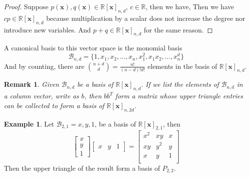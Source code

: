 \documentclass[12pt]{amsart}
\numberwithin{equation}{section}
\newtheorem{remark}[thm]{Remark}
\theoremstyle{definition}
\newtheorem{example}[thm]{Example}
\numberwithin{thm}{section}
\begin{document}
\begin{proof}
     Suppose $p(\mathbf{x}), q(\mathbf{x}) \in \mathbb{R}[\mathbf{x}]_{n, d}$, $c \in \mathbb{R}$, then we have,
     Then we have $cp \in \mathbb{R}[\mathbf{x}]_{n, d}$ because multiplication by a scalar does not increase the degree nor introduce new variables.
     And $p + q \in \mathbb{R}[\mathbf{x}]_{n, d}$ for the same reason. 

\end{proof}
A canonical basis to this vector space is the monomial basis 
\begin{equation*}
     \mathcal{B}_{n, d} = \{1, x_1, x_2, ..., x_n, x_1 ^ 2, x_1 x_2, ..., x_n^d\}
\end{equation*}
And by counting, there are ${n + d \choose d} = \frac{n!}{(n-d)! d!}$ elements in the basis of $\mathbb{R}[\mathbf{x}]_{n, d}$.

\begin{remark}
     \label{rem:idk}
     Given $\mathcal{B}_{n, d}$ be a basis of $\mathbb{R}[\mathbf{x}]_{n, d}$. 
     If we list the elements of $\mathcal{B}_{n, d}$ in a column vector, write as $b$, 
     then $b b^T$ form a matrix whose upper triangle entries can be collected to form a basis of $\mathbb{R}[\mathbf{x}]_{n, 2d}$.
\end{remark}

\begin{example}
     Let $\mathcal{B}_{2, 1} = {x, y, 1}$, be a basis of $\mathbb{R}[\mathbf{x}]_{2, 1}$, then 
     \begin{equation}
          \begin{bmatrix}
               x \\
               y \\
               1
          \end{bmatrix}
          \begin{bmatrix}
               x & y & 1
          \end{bmatrix}
          = \begin{bmatrix}
               x^2 & xy & x \\
               xy & y^2 & y \\
               x & y & 1 \\
          \end{bmatrix}
     \end{equation}
     Then the upper triangle of the result form a basis of $P_{2, 2}$.
\end{example}

\smallskip
\end{document}
